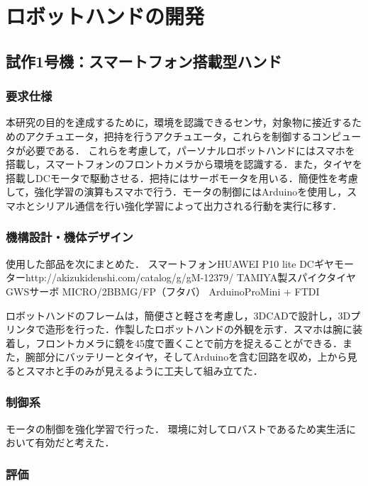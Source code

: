 \chapter{ロボットハンドの開発}
\label{chap_result}

\section{試作1号機：スマートフォン搭載型ハンド}

\subsection{要求仕様}
本研究の目的を達成するために，環境を認識できるセンサ，対象物に接近するためのアクチュエータ，把持を行うアクチュエータ，これらを制御するコンピュータが必要である．
これらを考慮して，パーソナルロボットハンドにはスマホを搭載し，スマートフォンのフロントカメラから環境を認識する．また，タイヤを搭載しDCモータで駆動させる．把持にはサーボモータを用いる．簡便性を考慮して，強化学習の演算もスマホで行う．モータの制御にはArduinoを使用し，スマホとシリアル通信を行い強化学習によって出力される行動を実行に移す．


\subsection{機構設計・機体デザイン}

使用した部品を次にまとめた．
スマートフォンHUAWEI P10 lite
DCギヤモーターhttp://akizukidenshi.com/catalog/g/gM-12379/
TAMIYA製スパイクタイヤ
GWSサーボ MICRO/2BBMG/FP（フタバ）
ArduinoProMini + FTDI


ロボットハンドのフレームは，簡便さと軽さを考慮し，3DCADで設計し，3Dプリンタで造形を行った．作製したロボットハンドの外観を示す．スマホは腕に装着し，フロントカメラに鏡を45度で置くことで前方を捉えることができる．また，腕部分にバッテリーとタイヤ，そしてArduinoを含む回路を収め，上から見るとスマホと手のみが見えるように工夫して組み立てた．


\subsection{制御系}
モータの制御を強化学習で行った．
環境に対してロバストであるため実生活において有効だと考えた．


\subsection{評価}


